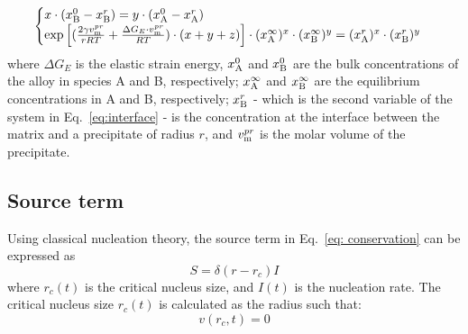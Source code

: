 \documentclass[11pt]{scrartcl}
\newcommand{\eref}[1]{Eq.~\eqref{#1}}
\begin{document}
\begin{equation}\label{eq:interface}
 \begin{cases}
x\cdot(x_{ \tiny \textrm{B}}^{0}-x_{ \tiny \textrm{B}}^{r}) =y\cdot( x_{ \tiny \textrm{A}}^{0}  -x_{ \tiny \textrm{A}}^{r}) \\
\exp\left[(\frac{2 \gamma  v_{\textrm m}^{pr}}{r  RT} +\frac{\Delta G_E\cdot v_{\textrm m}^{pr}}{RT} )\cdot(x+y+z) \right] \cdot (x_{ \tiny \textrm{A}}^{\infty})^{x} \cdot (x_{ \tiny \textrm{B}}^{\infty})^{y}  =  (x_{ \tiny \textrm{A}}^{r})^{x} \cdot (x_{ \tiny \textrm{B}}^{r})^{y}    \\
\end{cases} 
\end{equation}
where \hypertarget{strain_energy}{$\Delta G_E$} is the elastic strain energy,  \hypertarget{xb}{$x_{ \tiny \textrm{A}}^{0}$} and \hypertarget{xc}{$x_{ \tiny \textrm{B}}^{0}$} are the bulk concentrations of the alloy in species A and B, respectively;  \hypertarget{xaeq}{$x_{ \tiny \textrm{A}}^{\infty}$} and \hypertarget{xbeq}{$x_{ \tiny \textrm{B}}^{\infty}$} are the equilibrium concentrations in A and B, respectively; $x_{ \tiny \textrm{B}}^{r}$ - which is the second variable of the system in \eref{eq:interface} -  is the concentration at the interface between the matrix and a precipitate of radius $r$, and \hypertarget{vmol}{$v_{\textrm m}^{pr}$} is the molar volume of the precipitate. 


\subsection{Source term}
Using classical nucleation theory, the source term in \eref{eq: conservation} can be expressed as
%
\begin{equation}
\label{eq: source}
S = \delta\left(r - r_c\right) I
\end{equation}
%
where $r_c\left(t\right)$ is the critical nucleus size, and $I\left(t\right)$ is the nucleation rate.
The critical nucleus size $r_c(t)$ is calculated as the radius such that:
 \begin{equation}
 v(r_c, t) = 0
 \end{equation}
 
\end{document}
